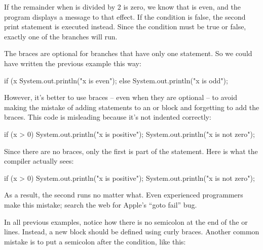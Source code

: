 
If the remainder when  is divided by 2 is zero, we know that  is even, and the program displays a message to that effect.
If the condition is false, the second print statement is executed instead.
Since the condition must be true or false, exactly one of the branches will run.

The braces are optional for branches that have only one statement.
So we could have written the previous example this way:

\begin{code}
if (x %
    System.out.println("x is even");
else
    System.out.println("x is odd");
\end{code}

However, it's better to use braces -- even when they are optional -- to avoid making the mistake of adding statements to an  or  block and forgetting to add the braces.
This code is misleading because it's not indented correctly:

\begin{code}
if (x > 0)
    System.out.println("x is positive");
    System.out.println("x is not zero");
\end{code}

Since there are no braces, only the first  is part of the  statement.
Here is what the compiler actually sees:

\begin{code}
if (x > 0) {
    System.out.println("x is positive");
}
    System.out.println("x is not zero");
\end{code}

As a result, the second  runs no matter what.
Even experienced programmers make this mistake; search the web for Apple's ``goto fail'' bug.


In all previous examples, notice how there is no semicolon at the end of the  or  lines.
Instead, a new block should be defined using curly braces.
Another common mistake is to put a semicolon after the condition, like this:


